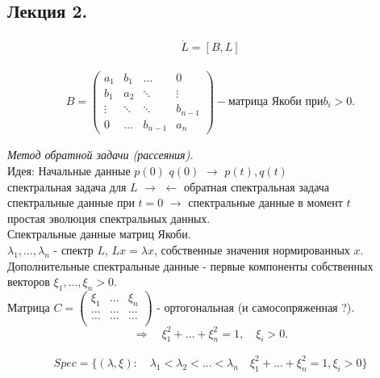 \documentclass[a4paper,12pt]{article}
\theoremstyle{definition}
\theoremstyle{definition}
\theoremstyle{definition}
\newcommand{\bear}[1]{\begin{eqnarray}\label{#1}}
\newcommand{\ear}{\end{eqnarray}}
\begin{document}
\subsection{Лекция 2.}
\bear{LP}
\dot{L} = [B,L]
\ear

\bear{matrice_L}
B =
\left( \begin{array}{cccc}
a_{1}& b_{1} &\ldots & 0\\
b_{1}& a_{2} &\ddots & \vdots\\
\vdots & \ddots &\ddots & b_{n-1}\\
0& \ldots & b_{n-1}  & a_{n}
\end{array}
\right)  - \textrm{матрица Якоби при} b_{i}>0.
\ear

\textit{Метод обратной задачи (рассеяния).}\\

Идея: Начальные данные $p(0)$ $q(0)$ $\longrightarrow$ $p(t),q(t)$\\
спектральная задача для $L$ $\longrightarrow$ $\longleftarrow$ обратная спектральная задача\\
спектральные данные при $t = 0$ $\longrightarrow$ спектральные данные в момент $t$\\
простая  эволюция спектральных данных.\\

Спектральные данные матриц Якоби.\\

$\lambda_{1},\ldots ,\lambda_{n}$ - спектр $L$, $Lx=\lambda x$, собственные значения нормированных $x$.\\
Дополнительные спектральные данные - первые компоненты собственных векторов $\xi_{1},\ldots,\xi_{n}>0$.\\
Матрица $C = \left(
               \begin{array}{ccc}
                 \xi_{1} & \ldots & \xi_{n} \\
                 \ldots & \ldots & \ldots \\
                 \ldots & \ldots & \ldots \\
               \end{array}
             \right)$ - ортогональная (и самосопряженная ?).\\

\[\Rightarrow\quad \xi^{2}_{1} + \ldots + \xi^{2}_{n} = 1,\quad \xi_{i} >0.\]

\bear{Spectr}
Spec = \{(\lambda,\xi): \quad \lambda_{1}<\lambda_{2}<\ldots<\lambda_{n} \quad \xi^{2}_{1} + \ldots + \xi^{2}_{n} = 1, \xi_{i} >0\}
\ear
\end{document}
